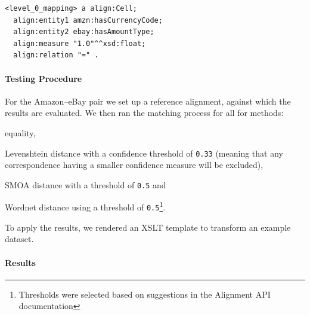 \lstset{caption=Level 0 mapping element example, label=listing_correspondence}
\lstset{language=turtle}
\begin{lstlisting}
<level_0_mapping> a align:Cell;
  align:entity1 amzn:hasCurrencyCode;
  align:entity2 ebay:hasAmountType;
  align:measure "1.0"^^xsd:float;
  align:relation "=" .
\end{lstlisting}

% 

\paragraph{Testing Procedure}
For the Amazon--eBay pair we set up a reference alignment, against which the results are evaluated.
We then ran the matching process for all for methods:
\begin{inparaenum}[(1)]
    \item equality,
    \item Levenshtein distance with a confidence threshold of \texttt{0.33} (meaning that any correspondence having a smaller confidence measure will be excluded),
    \item SMOA distance with a threshold of \texttt{0.5} and
    \item Wordnet distance using a threshold of \texttt{0.5}\footnote{Thresholds were selected based on suggestions in the Alignment API documentation}.
\end{inparaenum}
To apply the results, we rendered an XSLT template to transform an example dataset.

\paragraph{Results}

